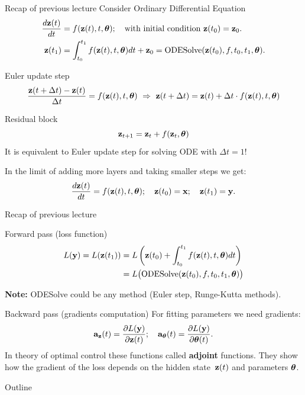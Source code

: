\begin{frame}{Recap of previous lecture}
	Consider Ordinary Differential Equation    
	\begin{align*}
	    \frac{d \mathbf{z}(t)}{dt} &= f(\mathbf{z}(t), t, \boldsymbol{\theta}); \quad \text{with initial condition }\mathbf{z}(t_0) = \mathbf{z}_0. \\
	    \mathbf{z}(t_1) &= \int^{t_1}_{t_0} f(\mathbf{z}(t), t, \boldsymbol{\theta}) d t  + \mathbf{z}_0 = \text{ODESolve}(\mathbf{z}(t_0), f, t_0,t_1, \boldsymbol{\theta}).
	\end{align*}
	\vspace{-0.4cm}
	\begin{block}{Euler update step}
		\vspace{-0.6cm}
		\[
			\frac{\mathbf{z}(t + \Delta t) - \mathbf{z}(t)}{\Delta t} = f(\mathbf{z}(t), t, \boldsymbol{\theta}) \,\, \Rightarrow \,\, \mathbf{z}(t + \Delta t) = \mathbf{z}(t) + \Delta t \cdot f(\mathbf{z}(t), t, \boldsymbol{\theta})
		\]
		\vspace{-0.7cm}
	\end{block}
	\begin{block}{Residual block}
		\vspace{-0.4cm}
		\[
			\mathbf{z}_{t + 1} = \mathbf{z}_t + f(\mathbf{z}_t, \boldsymbol{\theta})
		\]
		It is equivalent to Euler update step for solving ODE with $\Delta t = 1$!
	\end{block}
	In the limit of adding more layers and taking smaller steps we get: 
	\[
	    \frac{d \mathbf{z}(t)}{dt} = f(\mathbf{z}(t), t, \boldsymbol{\theta}); \quad \mathbf{z}(t_0) = \mathbf{x}; \quad \mathbf{z}(t_1) = \mathbf{y}.
	\]

\end{frame}
\begin{frame}{Recap of previous lecture}
	\begin{block}{Forward pass (loss function)}
		\vspace{-0.8cm}
		\begin{align*}
			L(\mathbf{y}) = L(\mathbf{z}(t_1)) &= L\left( \mathbf{z}(t_0) + \int_{t_0}^{t_1} f(\mathbf{z}(t), t, \boldsymbol{\theta}) dt \right) \\ &= L\bigl(\text{ODESolve}(\mathbf{z}(t_0), f, t_0,t_1, \boldsymbol{\theta}) \bigr)
		\end{align*}
	\vspace{-0.5cm}
	\end{block}
	\textbf{Note:} ODESolve could be any method (Euler step, Runge-Kutta methods).
	\begin{block}{Backward pass (gradients computation)}
		For fitting parameters we need gradients:
		\[
			\mathbf{a}_{\mathbf{z}}(t) = \frac{\partial L(\mathbf{y})}{\partial \mathbf{z}(t)}; \quad \mathbf{a}_{\boldsymbol{\theta}}(t) = \frac{\partial L(\mathbf{y})}{\partial \boldsymbol{\theta}(t)}.
		\]
		In theory of optimal control these functions called \textbf{adjoint} functions. 
		They show how the gradient of the loss depends on the hidden state~$\mathbf{z}(t)$ and parameters $\boldsymbol{\theta}$.
	\end{block}

\end{frame}
\begin{frame}{Outline}
	\tableofcontents
\end{frame}
